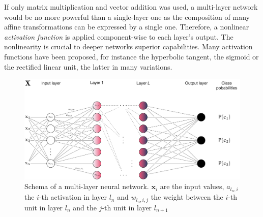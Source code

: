 If only matrix multiplication and vector addition was used, a multi-layer network would be no more
powerful than a single-layer one as the composition of many affine
transformations can be expressed by a single one. Therefore, a nonlinear
\emph{activation function} is applied component-wise to each layer's output. The
nonlinearity is crucial to deeper networks superior capabilities. Many
activation functions have been proposed, for instance the hyperbolic tangent,
the sigmoid or the rectified linear unit, the latter in many variations.

\begin{center}
\end{center}

\begin{figure}
    \hypertarget{fig:neuralnet}{%
        \centering
        \includegraphics[max width=\textwidth]{gfx/diagrams/neural_network/neural_net.pdf}
        \caption[Schema of a multi-layer neural network]{Schema of a multi-layer neural network. \(\mathbf{x}_i\) are
            the input values, \(a_{l_n,i}\) the \(i\)-th activation in layer \(l_n\)
            and \(w_{l_n,i,j}\) the weight between the \(i\)-th unit in layer
        \(l_n\) and the \(j\)-th unit in layer \(l_{n+1}\)}\label{fig:neuralnet}
    }
\end{figure}

